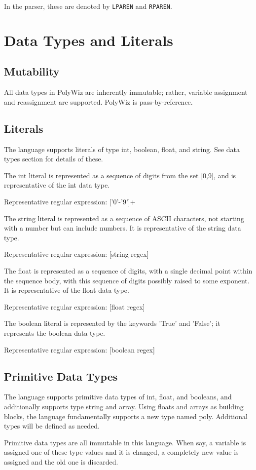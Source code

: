\documentclass{article}
\begin{document}
In the parser, these are denoted by \lstinline{LPAREN} and \lstinline{RPAREN}.

\section{Data Types and Literals}
\subsection{Mutability}
All data types in PolyWiz are inherently immutable; rather, variable assignment and reassignment are supported. PolyWiz is pass-by-reference.
\subsection{Literals}
The language supports literals of type int, boolean, float, and string. See data types section for details of these.

The int literal is represented as a sequence of digits from the set [0,9], and is representative of the int data type. 

Representative regular expression: ['0'-'9']+

The string literal is represented as a sequence of ASCII characters, not starting with a number but can include numbers. It is representative of the string data type.

Representative regular expression: [string regex]

The float is represented as a sequence of digits, with a single decimal point within the sequence body, with this sequence of digits possibly raised to some exponent. It is representative of the float data type.

Representative regular expression: [float regex]

The boolean literal is represented by the keywords 'True' and 'False'; it represents the boolean data type.

Representative regular expression: [boolean regex]
\subsection{Primitive Data Types}
The language supports primitive data types of int, float, and booleans, and additionally supports type string and array. Using floats and arrays as building blocks, the language fundamentally supports a new type named poly. Additional types will be defined as needed.

Primitive data types are all immutable in this language. When say, a variable is assigned one of these type values and it is changed, a completely new value is assigned and the old one is discarded.
\end{document}
